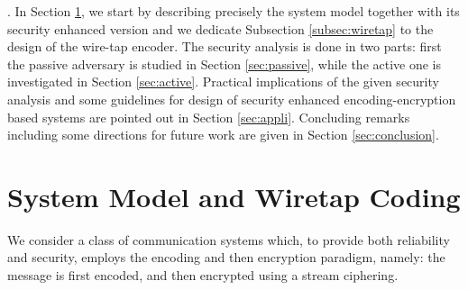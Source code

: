 \documentclass{article}[11pt]
\begin{document}
\vspace*{0.25cm} . In
Section \ref{sec:model}, we start by describing precisely the
system model together with its security enhanced version and we
dedicate Subsection \ref{subsec:wiretap} to the design of the
wire-tap encoder. The security analysis is done in two parts:
first the passive adversary is studied in Section
\ref{sec:passive}, while the  active one is investigated in
Section \ref{sec:active}. Practical implications of the given
security analysis and some guidelines for design of security
enhanced encoding-encryption based systems are pointed out in
Section \ref{sec:appli}. Concluding remarks including some
directions for future work are given in Section
\ref{sec:conclusion}.



\section{System Model and Wiretap Coding}
\label{sec:model}

We consider a class of communication systems which, to provide
both reliability and security, employs the encoding and then encryption
paradigm, namely: the message is first encoded, and then encrypted
using a stream ciphering.
\end{document}
